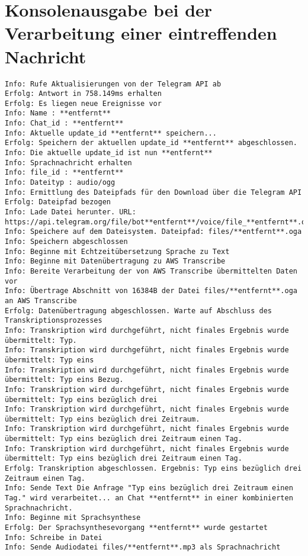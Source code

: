 \section{Konsolenausgabe bei der Verarbeitung einer eintreffenden Nachricht}
\begin{lstlisting}[label=log-msg, numbers=none]
Info: Rufe Aktualisierungen von der Telegram API ab 
Erfolg: Antwort in 758.149ms erhalten 
Erfolg: Es liegen neue Ereignisse vor 
Info: Name : **entfernt** 
Info: Chat_id : **entfernt** 
Info: Aktuelle update_id **entfernt** speichern... 
Erfolg: Speichern der aktuellen update_id **entfernt** abgeschlossen. 
Info: Die aktuelle update_id ist nun **entfernt** 
Info: Sprachnachricht erhalten 
Info: file_id : **entfernt** 
Info: Dateityp : audio/ogg 
Info: Ermittlung des Dateipfads für den Download über die Telegram API 
Erfolg: Dateipfad bezogen 
Info: Lade Datei herunter. URL: https://api.telegram.org/file/bot**entfernt**/voice/file_**entfernt**.oga 
Info: Speichere auf dem Dateisystem. Dateipfad: files/**entfernt**.oga 
Info: Speichern abgeschlossen 
Info: Beginne mit Echtzeitübersetzung Sprache zu Text 
Info: Beginne mit Datenübertragung zu AWS Transcribe 
Info: Bereite Verarbeitung der von AWS Transcribe übermittelten Daten vor 
Info: Übertrage Abschnitt von 16384B der Datei files/**entfernt**.oga an AWS Transcribe 
Erfolg: Datenübertragung abgeschlossen. Warte auf Abschluss des Transkriptionsprozesses 
Info: Transkription wird durchgeführt, nicht finales Ergebnis wurde übermittelt: Typ. 
Info: Transkription wird durchgeführt, nicht finales Ergebnis wurde übermittelt: Typ eins 
Info: Transkription wird durchgeführt, nicht finales Ergebnis wurde übermittelt: Typ eins Bezug. 
Info: Transkription wird durchgeführt, nicht finales Ergebnis wurde übermittelt: Typ eins bezüglich drei 
Info: Transkription wird durchgeführt, nicht finales Ergebnis wurde übermittelt: Typ eins bezüglich drei Zeitraum. 
Info: Transkription wird durchgeführt, nicht finales Ergebnis wurde übermittelt: Typ eins bezüglich drei Zeitraum einen Tag. 
Info: Transkription wird durchgeführt, nicht finales Ergebnis wurde übermittelt: Typ eins bezüglich drei Zeitraum einen Tag. 
Erfolg: Transkription abgeschlossen. Ergebnis: Typ eins bezüglich drei Zeitraum einen Tag. 
Info: Sende Text Die Anfrage "Typ eins bezüglich drei Zeitraum einen Tag." wird verarbeitet... an Chat **entfernt** in einer kombinierten Sprachnachricht. 
Info: Beginne mit Sprachsynthese 
Erfolg: Der Sprachsynthesevorgang **entfernt** wurde gestartet 
Info: Schreibe in Datei 
Info: Sende Audiodatei files/**entfernt**.mp3 als Sprachnachricht 

\end{lstlisting}
